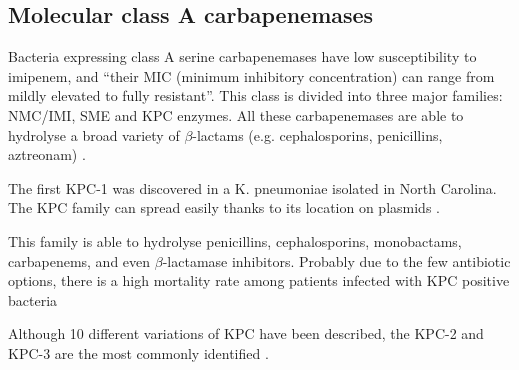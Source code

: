 \documentclass[11pt]{report}
\begin{document}
\subsection{Molecular class A carbapenemases}
Bacteria expressing class A serine carbapenemases have low susceptibility to imipenem, and “their MIC (minimum inhibitory concentration) can range from mildly elevated to fully resistant”. This class is divided into three major families: NMC/IMI, SME and KPC enzymes.
All these carbapenemases are able to hydrolyse a broad variety of $\beta$-lactams (e.g. cephalosporins, penicillins, aztreonam) \cite{KONG2010} \cite{Queenan2007}.


The first KPC-1 was discovered in a K. pneumoniae isolated  in North Carolina. The KPC family can spread easily thanks to its location on plasmids \cite{Queenan2007}.

This family is able to hydrolyse penicillins, cephalosporins, monobactams, carbapenems, and even $\beta$-lactamase inhibitors. Probably due to the few antibiotic options, there is a high mortality rate among patients infected with KPC positive bacteria \cite{MunozPrice2013}
                   
Although 10 different variations of KPC have been described, the KPC-2 and KPC-3 are the most commonly identified \cite{WaltherRasmussen2007}.



































\end{document}
